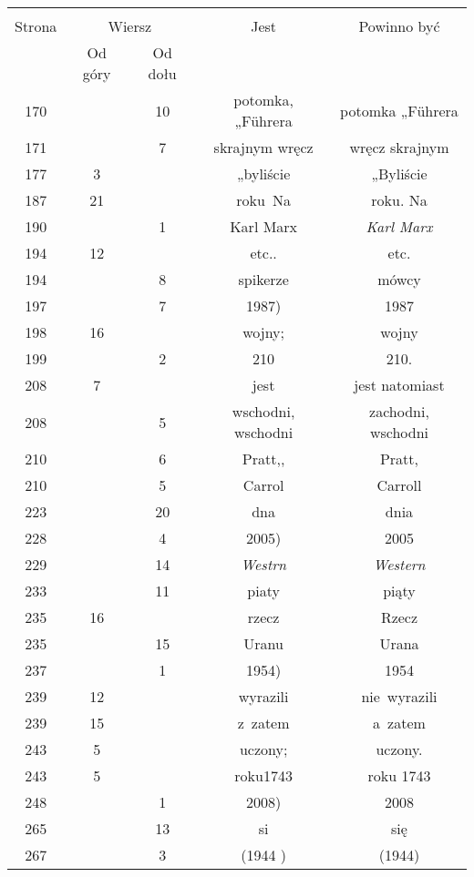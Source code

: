 \documentclass[a4paper,11pt]{article}
\begin{document}
\begin{center}
  \begin{tabular}{|c|c|c|c|c|}
    \hline
    & \multicolumn{2}{c|}{} & & \\
    Strona & \multicolumn{2}{c|}{Wiersz} & Jest
                              & Powinno być \\ \cline{2-3}
    & Od góry & Od dołu & & \\
    \hline
    170 & & 10 & potomka, „F\"{u}hrera & potomka „F\"{u}hrera \\
    171 & &  7 & skrajnym wręcz & wręcz skrajnym \\
    177 &  3 & & „byliście & „Byliście \\
    187 & 21 & & roku~Na & roku. Na \\
    190 & &  1 & Karl Marx & \emph{Karl Marx} \\
    194 & 12 & & etc.. & etc. \\
    194 & &  8 & spikerze & mówcy \\
    197 & &  7 & 1987) & 1987 \\
    198 & 16 & & wojny; & wojny \\
    199 & &  2 & 210 & 210. \\
    208 &  7 & & jest & jest natomiast \\
    208 & &  5 & wschodni, wschodni & zachodni, wschodni \\
    210 & &  6 & Pratt,, & Pratt, \\
    210 & &  5 & Carrol & Carroll \\
    223 & & 20 & dna & dnia \\
    228 & &  4 & 2005) & 2005 \\
    229 & & 14 & \emph{Westrn} & \emph{Western} \\
    233 & & 11 & piaty & piąty \\
    235 & 16 & & rzecz & Rzecz \\
    235 & & 15 & Uranu & Urana \\
    237 & &  1 & 1954) & 1954 \\
    239 & 12 & & wyrazili & nie~wyrazili \\
    239 & 15 & & z~zatem & a~zatem \\
    243 &  5 & & uczony; & uczony. \\
    243 &  5 & & roku1743 & roku 1743 \\
    248 & &  1 & 2008) & 2008 \\
    265 & & 13 & si & się \\
    267 & &  3 & (1944 ) & (1944) \\

\end{tabular}
\end{center}
\end{document}
